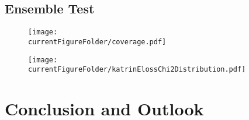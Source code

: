 \subsection{Ensemble Test}
\label{sec:katrinElossModelResultsEnsemble}
\begin{figure}[th]
	\centering
	\texttt{[image: \\currentFigureFolder/coverage.pdf]}
	\label{fig:katrinElossResultsCoverage}
\end{figure}

\begin{figure}[t]
	\centering
	\texttt{[image: \\currentFigureFolder/katrinElossChi2Distribution.pdf]}
	\xcaption{}{}{}
	\label{fig:katrinElossStatisticsChi2}
\end{figure}


\section{Conclusion and Outlook}
\label{sec:katrinElossModelConclusion}